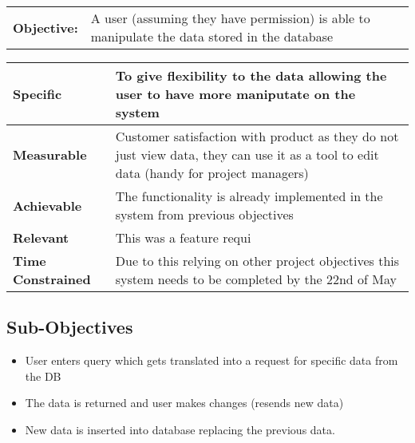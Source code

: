 \begin{table}[H]
    \begin{tabularx}{\textwidth}{| l | X |}
        \hline
        \textbf{Objective:} & A user (assuming they have permission) is able to manipulate the data stored in the database \\
    \end{tabularx}
    \begin{tabularx}{\textwidth}{| l | X |}
        \hline
        \textbf{Specific} & To give flexibility to the data allowing the user to have more maniputate on the system\\ \hline
        \textbf{Measurable} & Customer satisfaction with product as they do not just view data, they can use it as a tool to edit data (handy for project managers)\\ \hline
        \textbf{Achievable} &  The functionality is already implemented in the system from previous objectives\\ \hline
        \textbf{Relevant} &  This was a feature requi \\ \hline
        \textbf{Time Constrained} & Due to this relying on other project objectives this system needs to be completed by the 22nd of May \\ \hline
    \end{tabularx}
\end{table}

\subsection{Sub-Objectives}

	\begin{itemize}
		\item User enters query which gets translated into a request for specific data from the DB
		\item The data is returned and user makes changes (resends new data)
		\item New data is inserted into database replacing the previous data.
	\end{itemize}
